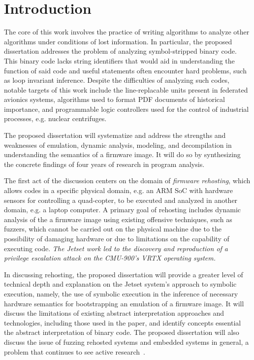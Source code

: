 \section{Introduction}
\label{intro}

The core of this work involves the practice of writing algorithms to analyze other algorithms under conditions of lost information.
In particular, the proposed dissertation addresses the problem of analyzing symbol-stripped binary code. 
This binary code lacks string identifiers that would aid in understanding the function of said code and useful statements often encounter hard problems, such as loop invariant inference.
Despite the difficulties of analyzing such codes, notable targets of this work include the line-replacable units present in federated avionics systems, algorithms used to format PDF documents of historical importance, and programmable logic controllers used for the control of industrial processes, e.g. nuclear centrifuges.

The proposed dissertation will systematize and address the strengths and weaknesses of emulation, dynamic analysis, modeling, and decompilation in understanding the semantics of a firmware image. 
It will do so by synthesizing the concrete findings of four years of research in program analysis.

The first act of the discussion centers on the domain of \emph{firmware rehosting}, which allows codes in a specific physical domain, e.g. an ARM SoC with hardware sensors for controlling a quad-copter, to be executed and analyzed in another domain, e.g. a laptop computer.
A primary goal of rehosting includes dynamic analysis of the a firmware image using existing offensive techniques, such as fuzzers, which cannot be carried out on the physical machine due to the possibility of damaging hardware or due to limitations on the capability of executing code.
\emph{The Jetset work led to the discovery and reproduction of a privilege escalation attack on the CMU-900's VRTX operating system.}

In discussing rehosting, the proposed dissertation will provide a greater level of technical depth and explanation on the Jetset system's approach to symbolic execution, namely, the use of symbolic execution in the inference of necessary hardware semantics for bootstrapping an emulation of a firmware image.
It will discuss the limitations of existing abstract interpretation approaches and technologies, including those used in the paper, and identify concepts essential the abstract interpretation of binary code.
The proposed dissertation will also discuss the issue of fuzzing rehosted systems and embedded systems in general, a problem that continues to see active research~\cite{zhu2022fuzzing}.

